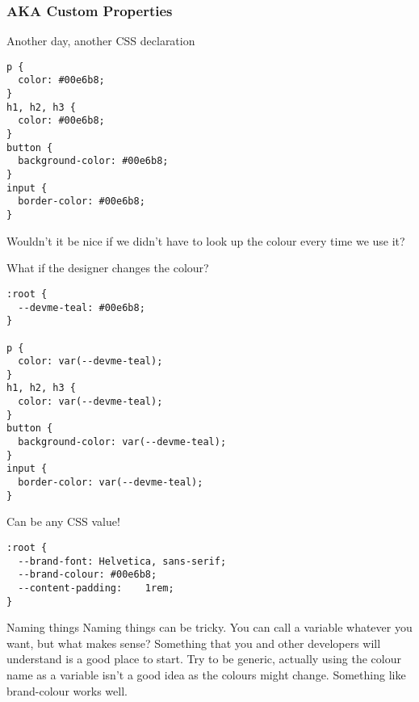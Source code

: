 \subsubsection{AKA Custom Properties}

Another day, another CSS declaration

\begin{verbatim}
p {
  color: #00e6b8;
}
h1, h2, h3 {
  color: #00e6b8;
}
button {
  background-color: #00e6b8;
}
input {
  border-color: #00e6b8;
}
\end{verbatim}

Wouldn't it be nice if we didn't have to look up the colour every time we use it?

What if the designer changes the colour?

\begin{verbatim}
:root {
  --devme-teal: #00e6b8;
}

p {
  color: var(--devme-teal);
}
h1, h2, h3 {
  color: var(--devme-teal);
}
button {
  background-color: var(--devme-teal);
}
input {
  border-color: var(--devme-teal);
}
\end{verbatim}

Can be any CSS value!

\begin{verbatim}
:root {
  --brand-font: Helvetica, sans-serif;
  --brand-colour: #00e6b8;
  --content-padding:	1rem;
}
\end{verbatim}

\begin{infobox}{Naming things}
    Naming things can be tricky. You can call a variable whatever you want, but what makes sense? Something that you and other developers will understand is a good place to start. Try to be generic, actually using the colour name as a variable isn't a good idea as the colours might change. Something like brand-colour works well.
\end{infobox}

